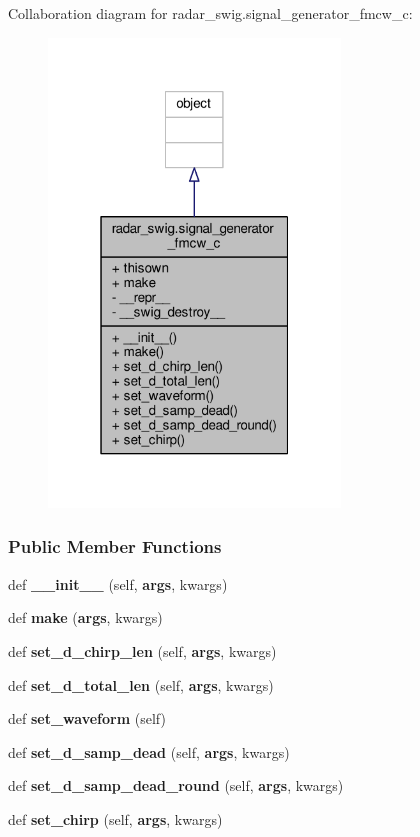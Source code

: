 Collaboration diagram for radar\+\_\+swig.\+signal\+\_\+generator\+\_\+fmcw\+\_\+c\+:
\nopagebreak
\begin{figure}[H]
\begin{center}
\leavevmode
\includegraphics[width=220pt]{d9/de9/classradar__swig_1_1signal__generator__fmcw__c__coll__graph}
\end{center}
\end{figure}
\subsubsection*{Public Member Functions}
\begin{DoxyCompactItemize}
\item 
def {\bf \+\_\+\+\_\+init\+\_\+\+\_\+} (self, {\bf args}, kwargs)
\item 
def {\bf make} ({\bf args}, kwargs)
\item 
def {\bf set\+\_\+d\+\_\+chirp\+\_\+len} (self, {\bf args}, kwargs)
\item 
def {\bf set\+\_\+d\+\_\+total\+\_\+len} (self, {\bf args}, kwargs)
\item 
def {\bf set\+\_\+waveform} (self)
\item 
def {\bf set\+\_\+d\+\_\+samp\+\_\+dead} (self, {\bf args}, kwargs)
\item 
def {\bf set\+\_\+d\+\_\+samp\+\_\+dead\+\_\+round} (self, {\bf args}, kwargs)
\item 
def {\bf set\+\_\+chirp} (self, {\bf args}, kwargs)
\end{DoxyCompactItemize}
